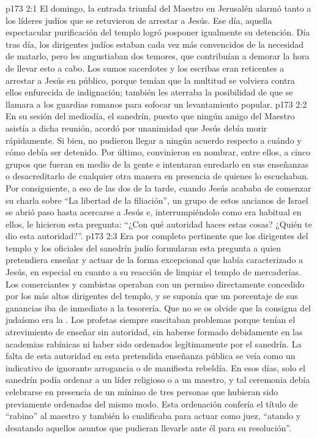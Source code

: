\vs p173 2:1 El domingo, la entrada triunfal del Maestro en Jerusalén alarmó tanto a los líderes judíos que se retuvieron de arrestar a Jesús. Ese día, aquella espectacular purificación del templo logró posponer igualmente su detención. Día tras día, los dirigentes judíos estaban cada vez más convencidos de la necesidad de matarlo, pero les angustiaban dos temores, que contribuían a demorar la hora de llevar esto a cabo. Los sumos sacerdotes y los escribas eran reticentes a arrestar a Jesús en público, porque temían que la multitud se volviera contra ellos enfurecida de indignación; también les aterraba la posibilidad de que se llamara a los guardias romanos para sofocar un levantamiento popular.
\vs p173 2:2 En su sesión del mediodía, el sanedrín, puesto que ningún amigo del Maestro asistía a dicha reunión, acordó por unanimidad que Jesús debía morir rápidamente. Si bien, no pudieron llegar a ningún acuerdo respecto a cuándo y cómo debía ser detenido. Por último, convinieron en nombrar, entre ellos, a cinco grupos que fueran en medio de la gente e intentaran enredarlo en sus enseñanzas o desacreditarlo de cualquier otra manera en presencia de quienes lo escuchaban. Por consiguiente, a eso de las dos de la tarde, cuando Jesús acababa de comenzar su charla sobre “La libertad de la filiación”, un grupo de estos ancianos de Israel se abrió paso hasta acercarse a Jesús e, interrumpiéndolo como era habitual en ellos, le hicieron esta pregunta: “¿Con qué autoridad haces estas cosas? ¿Quién te dio esta autoridad?”.
\vs p173 2:3 Era por completo pertinente que los dirigentes del templo y los oficiales del sanedrín judío formularan esta pregunta a quien pretendiera enseñar y actuar de la forma excepcional que había caracterizado a Jesús, en especial en cuanto a su reacción de limpiar el templo de mercaderías. Los comerciantes y cambistas operaban con un permiso directamente concedido por los más altos dirigentes del templo, y se suponía que un porcentaje de sus ganancias iba de inmediato a la tesorería. Que no se os olvide que la consigna del judaísmo era la . Los profetas siempre suscitaban problemas porque tenían el atrevimiento de enseñar sin autoridad, sin haberse formado debidamente en las academias rabínicas ni haber sido ordenados legítimamente por el sanedrín. La falta de esta autoridad en esta pretendida enseñanza pública se veía como un indicativo de ignorante arrogancia o de manifiesta rebeldía. En esos días, solo el sanedrín podía ordenar a un líder religioso o a un maestro, y tal ceremonia debía celebrarse en presencia de un mínimo de tres personas que hubieran sido previamente ordenadas del mismo modo. Esta ordenación confería el título de “rabino” al maestro y también lo cualificaba para actuar como juez, “atando y desatando aquellos asuntos que pudieran llevarle ante él para su resolución”.
